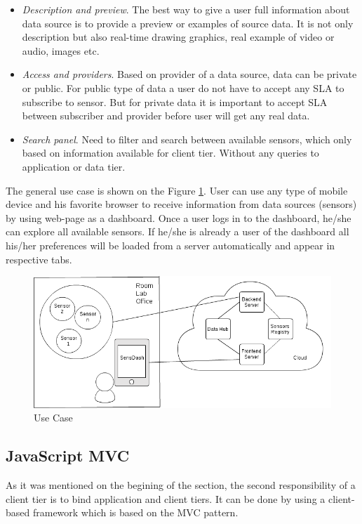 \begin{itemize}
      \item \emph{Description and preview}. The best way to give a user full information about data source is to provide a preview or examples of source data. It is not only description but also real-time drawing graphics, real example of video or audio, images etc.
      \item \emph{Access and providers}. Based on provider of a data source, data can be private or public. For public type of data a user do not have to accept any SLA to subscribe to sensor. But for private data it is important to accept SLA between subscriber and provider before user will get any real data.
      \item \emph{Search panel}. Need to filter and search between available sensors, which only based on information available for client tier. Without any queries to application or data tier.
      \end{itemize}

    The general use case is shown on the Figure \ref{img:use_case_basic}. User can use any type of mobile device and his favorite browser to receive information from data sources (sensors) by using web-page as a dashboard. Once a user logs in to the dashboard, he/she can explore all available sensors. If he/she is already a user of the dashboard all his/her preferences will be loaded from a server automatically and appear in respective tabs.

        \begin{figure}[!ht]
        \centering
        \includegraphics[scale=0.6]{images/User_Case.png}   
        \caption[Use Case]{Use Case}
        \label{img:use_case_basic}                        
        \end{figure}

    \subsection{JavaScript MVC}
    As it was mentioned on the begining of the section, the second responsibility of a client tier is to bind application and client tiers. It can be done by using a client-based framework which is based on the MVC pattern.

